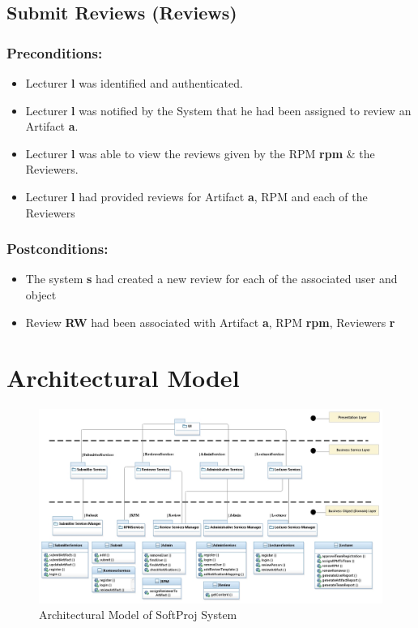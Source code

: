 \newpage

\subsection*{Submit Reviews (Reviews)}
\subsubsection*{Preconditions:}
\begin{itemize}
\itemsep-1.5em 
    \item Lecturer \textbf{l} was identified and authenticated.
    \item Lecturer \textbf{l } was notified by the System that he had been assigned to review an Artifact \textbf{a}.
    \item Lecturer \textbf{l} was able to view the reviews given by the RPM \textbf{rpm} \& the Reviewers.
    \item Lecturer \textbf{l} had provided reviews for Artifact \textbf{a}, RPM and each of the Reviewers
\end{itemize}



\subsubsection*{Postconditions:}
\begin{itemize}
\itemsep-1.5em 
    \item The system \textbf{s} had created a new review for each of the associated user and object
    \item Review \textbf{RW} had been associated with Artifact \textbf{a}, RPM \textbf{rpm}, Reviewers \textbf{r}
\end{itemize}





\section{Architectural Model}

\begin{figure}[h]
\includegraphics[width=15cm]{Architectural.jpeg}
\centering
\caption{Architectural Model of SoftProj System}
\centering
\end{figure}
\vfill
\hspace{0pt}
\pagebreak





